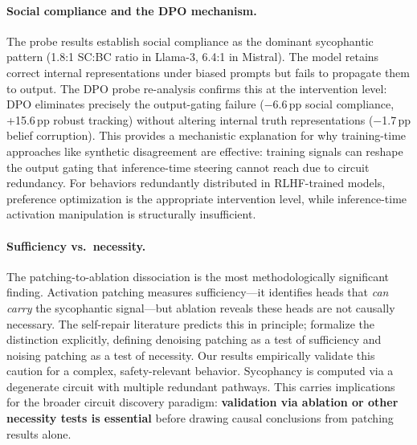 \documentclass{article}
\begin{document}
\paragraph{Social compliance and the DPO mechanism.}
The probe results establish social compliance as the dominant sycophantic pattern (1.8:1 SC:BC ratio in Llama-3, 6.4:1 in Mistral). The model retains correct internal representations under biased prompts but fails to propagate them to output. The DPO probe re-analysis confirms this at the intervention level: DPO eliminates precisely the output-gating failure ($-$6.6\,pp social compliance, +15.6\,pp robust tracking) without altering internal truth representations ($-$1.7\,pp belief corruption). This provides a mechanistic explanation for why training-time approaches like synthetic disagreement \citep{wei2023simple} are effective: training signals can reshape the output gating that inference-time steering cannot reach due to circuit redundancy. For behaviors redundantly distributed in RLHF-trained models, preference optimization is the appropriate intervention level, while inference-time activation manipulation is structurally insufficient.

\paragraph{Sufficiency vs.\ necessity.}
The patching-to-ablation dissociation is the most methodologically significant finding. Activation patching measures sufficiency---it identifies heads that \emph{can carry} the sycophantic signal---but ablation reveals these heads are not causally necessary. The self-repair literature \citep{mcgrath2023hydra,rushing2024explorations} predicts this in principle; \citet{heimersheim2024patching} formalize the distinction explicitly, defining denoising patching as a test of sufficiency and noising patching as a test of necessity. Our results empirically validate this caution for a complex, safety-relevant behavior. Sycophancy is computed via a degenerate circuit with multiple redundant pathways. This carries implications for the broader circuit discovery paradigm: \textbf{validation via ablation or other necessity tests is essential} before drawing causal conclusions from patching results alone.
\end{document}
